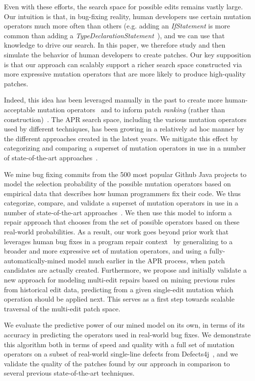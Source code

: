 \documentclass[conference]{IEEEtran}
\begin{document}
Even with these efforts, the search space for possible edits remains vastly large. Our intuition is that, in bug-fixing reality, human developers use certain mutation operators 
much more often than 
others (e.g. adding an \emph{IfStatement} is more common than adding a \emph{TypeDeclarationStatement}~\cite{Soto16}), and we can use that knowledge to drive our search. In this paper, we therefore study and then simulate the behavior of human
developers to create patches. Our key supposition is that our approach can scalably support a richer
search space constructed via more expressive mutation operators that are more
likely to produce high-quality patches.

Indeed, this idea has been
leveraged manually in the past to create more human-acceptable mutation
operators~\cite{kim2013} and to inform patch \emph{ranking} (rather than construction)~\cite{xuan16,long16proph}.
The APR search space, including the various mutation
operators used by different techniques, has been growing in a relatively ad hoc 
manner by the different approaches created in the latest years. We mitigate this effect by categorizing and comparing a superset of
mutation operators in use in a number of 
state-of-the-art approaches~\cite{legoues12,Weimer13,kim2013,long16proph}.

We mine bug fixing commits from 
the 500 most popular Github Java projects to model the selection probability of
the possible mutation operators based on 
empirical data that describes how human programmers fix their code.  We thus
categorize, compare, and validate a superset of
mutation operators in use in a number of 
state-of-the-art approaches~\cite{legoues12,Weimer13,kim2013,long16proph}. We then use this
model to inform a repair approach that chooses from the set of possible
operators based on these real-world
probabilities.
As a result, our work goes beyond prior work that leverages human bug
fixes in a program repair context~\cite{kim2013,xuan16,long16proph} by generalizing
to a broader and more expressive set of
mutation operators, and using a fully-automatically-mined model much 
earlier in the APR process, when
patch candidates are actually created.  
Furthermore, we propose and initially validate a new approach for modeling
multi-edit repairs based on mining previous rules from historical edit data, 
predicting from a given 
single-edit mutation which operation should be applied
next.  This serves  as a first step towards
scalable traversal of the multi-edit patch space. 


We evaluate the predictive power of our mined model on its own, in terms of its
accuracy in predicting the operators used in real-world bug fixes. We demonstrate this algorithm both in terms of speed and quality with a full set of mutation
operators on a subset of real-world single-line defects
from Defects4j~\cite{just14}, and we validate the quality of the patches found by our approach
in comparison to several previous state-of-the-art techniques. 
\end{document}
